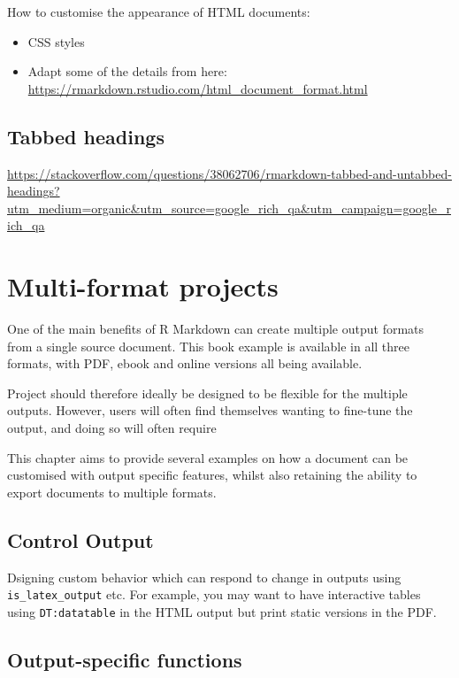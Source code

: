 \documentclass[]{book}
\providecommand{\tightlist}{%
  \setlength{\itemsep}{0pt}\setlength{\parskip}{0pt}}
\theoremstyle{definition}
\theoremstyle{definition}
\theoremstyle{definition}
\theoremstyle{remark}
\begin{document}
How to customise the appearance of HTML documents:

\begin{itemize}
\tightlist
\item
  CSS styles
\item
  Adapt some of the details from here:
  \url{https://rmarkdown.rstudio.com/html_document_format.html}
\end{itemize}

\hypertarget{tabbed-headings}{%
\section{Tabbed headings}\label{tabbed-headings}}

\url{https://stackoverflow.com/questions/38062706/rmarkdown-tabbed-and-untabbed-headings?utm_medium=organic\&utm_source=google_rich_qa\&utm_campaign=google_rich_qa}

\hypertarget{multi-format-projects}{%
\chapter{Multi-format projects}\label{multi-format-projects}}

One of the main benefits of R Markdown can create multiple output
formats from a single source document. This book example is available in
all three formats, with PDF, ebook and online versions all being
available.

Project should therefore ideally be designed to be flexible for the
multiple outputs. However, users will often find themselves wanting to
fine-tune the output, and doing so will often require

This chapter aims to provide several examples on how a document can be
customised with output specific features, whilst also retaining the
ability to export documents to multiple formats.

\hypertarget{control-output}{%
\section{Control Output}\label{control-output}}

Dsigning custom behavior which can respond to change in outputs using
\texttt{is\_latex\_output} etc. For example, you may want to have
interactive tables using \texttt{DT:datatable} in the HTML output but
print static versions in the PDF.

\hypertarget{output-specific-functions}{%
\section{Output-specific functions}\label{output-specific-functions}}
\end{document}
